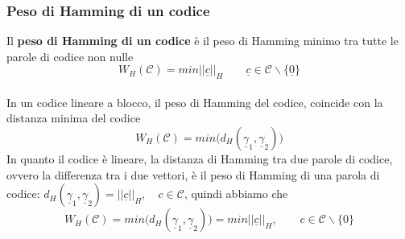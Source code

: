 \documentclass{article}
\begin{document}
\subsubsection{Peso di Hamming di un codice}
Il \textbf{peso di Hamming di un codice} è il peso di Hamming minimo tra tutte le parole di codice non nulle $$W_H(\mathcal{C})=min||\underline{c}||_H\qquad\underline{c}\in\mathcal{C}\backslash\{\underline{0}\}$$\\
In un codice lineare a blocco, il peso di Hamming del codice, coincide con la distanza minima del codice $$W_H(\mathcal{C})=min\big(d_H(\underline{\gamma}_1, \underline{\gamma}_2)\big)$$
In quanto il codice è lineare, la distanza di Hamming tra due parole di codice, ovvero la differenza tra i due vettori, è il peso di Hamming di una parola di codice: $d_H(\underline{\gamma}_1,\underline{\gamma}_2)=||\underline{c}||_H,\quad c\in\mathcal{C}$, quindi abbiamo che $$W_H(\mathcal{C})=min\big(d_H(\underline{\gamma}_1,\underline{\gamma}_2)\big)=min||\underline{c}||_H,\qquad c\in\mathcal{C}\backslash\{0\}$$
\end{document}
